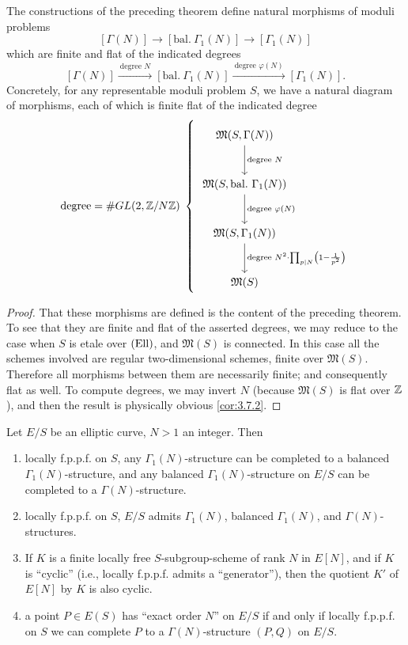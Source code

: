 \begin{kcor}\label{cor:5.5.3}
The constructions of the preceding theorem define natural morphisms of moduli problems
\[
[\Gamma(N)] \longrightarrow [\mathrm{bal.}\ \Gamma_1(N)] \longrightarrow [\Gamma_1(N)]
\]
which are finite and flat of the indicated degrees
\[
[\Gamma(N)] \xrightarrow{\ \text{degree } N\ } [\mathrm{bal.}\ \Gamma_1(N)] \xrightarrow{\ \text{degree } \varphi(N)\ } [\Gamma_1(N)].
\]
Concretely, for any representable moduli problem $S$, we have a natural diagram of morphisms, each of which is finite flat of the indicated degree
\[
\text{degree} = \#GL(2, \Z/N\Z)\;
\left\{\;
\begin{tikzcd}[row sep=large, column sep=small]
\mathfrak{M}(S, \Gamma(N)) \arrow[d, "\text{degree } N"] \\
\mathfrak{M}(S, \mathrm{bal.}\ \Gamma_1(N)) \arrow[d, "\text{degree } \varphi(N)"] \\
\mathfrak{M}(S, \Gamma_1(N)) \arrow[d, "{\text{degree } N^2\cdot\prod_{p\mid N}\left(1-\frac{1}{p^2}\right)}"] \\
\mathfrak{M}(S)
\end{tikzcd}
\right.
\]
\end{kcor}

\begin{proof}
That these morphisms are defined is the content of the preceding theorem. To see that they are finite and flat of the asserted degrees, we may reduce to the case when $S$ is etale over $(\mathrm{Ell})$, and $\mathfrak{M}(S)$ is connected. In this case all the schemes involved are regular two-dimensional schemes, finite over $\mathfrak{M}(S)$. Therefore all morphisms between them are necessarily finite; and consequently flat as well. To compute degrees, we may invert $N$ (because $\mathfrak{M}(S)$ is flat over $\mathbb{Z}$), and then the result is physically obvious \ref{cor:3.7.2}.
\end{proof}

\begin{kcor}\label{cor:5.5.4}
Let $E/S$ be an elliptic curve, $N > 1$ an integer. Then
\begin{enumerate}[(1)]
\item locally f.p.p.f. on $S$, any $\Gamma_1(N)$-structure can be completed to a balanced $\Gamma_1(N)$-structure, and any balanced $\Gamma_1(N)$-structure on $E/S$ can be completed to a $\Gamma(N)$-structure.
\item locally f.p.p.f. on $S$, $E/S$ admits $\Gamma_1(N)$, balanced $\Gamma_1(N)$, and $\Gamma(N)$-structures.
\item If $K$ is a finite locally free $S$-subgroup-scheme of rank $N$ in $E[N]$, and if $K$ is ``cyclic'' (i.e., locally f.p.p.f. admits a ``generator''), then the quotient $K'$ of $E[N]$ by $K$ is also cyclic.
\item a point $P \in E(S)$ has ``exact order $N$'' on $E/S$ if and only if locally f.p.p.f. on $S$ we can complete $P$ to a $\Gamma(N)$-structure $(P, Q)$ on $E/S$.
\end{enumerate}
\end{kcor}

